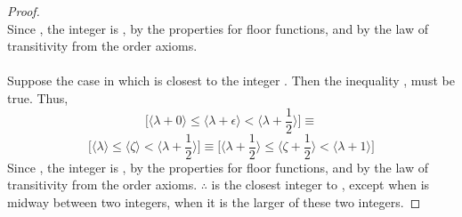 \documentclass[preview]{standalone}
\begin{document}
\begin{proof}
\begin{equation*}
    \end{equation*}
    Since 
    , 
    the integer  is 
    \bm{$\big \langle \lambda + 1 \big \rangle$}, 
    by the properties for floor functions,
    and by the law of transitivity from the order axioms.
    \\ \\
     Suppose the case in which \bm{$\zeta$} is closest to the integer \bm{$\lambda$}. 
    Then the inequality , 
    must be true. Thus, 
    \begin{equation*}
        \bigg[
            \Big \langle
                \lambda + 0
            \Big \rangle
                \leq
            \Big \langle
                \lambda + \epsilon
            \Big \rangle
                <
            \Big \langle
                \lambda + \frac{1}{2}
            \Big \rangle
        \bigg]
            \equiv
    \end{equation*}
    \begin{equation*}
        \bigg[
            \Big \langle
                \lambda
            \Big \rangle
                \leq
            \Big \langle
                \zeta
            \Big \rangle
                <
            \Big \langle
                \lambda + \frac{1}{2}
            \Big \rangle
        \bigg]
            \equiv
        \bigg[
            \Big \langle
                \lambda + \frac{1}{2}
            \Big \rangle
                \leq
            \Big \langle
                \zeta + \frac{1}{2}
            \Big \rangle
                <
            \Big \langle
                \lambda + 1
            \Big \rangle
        \bigg]
    \end{equation*}
    Since 
    ,
    the integer  is 
    \bm{$\big \langle \lambda \big \rangle$}, 
    by the properties for floor functions,
    and by the law of transitivity from the order axioms.
    $\therefore$
    is the closest integer to \bm{$\zeta$}, 
    except when \bm{$\zeta$} is midway between two integers, 
    when it is the larger of these two integers.
\end{proof}
\end{document}

